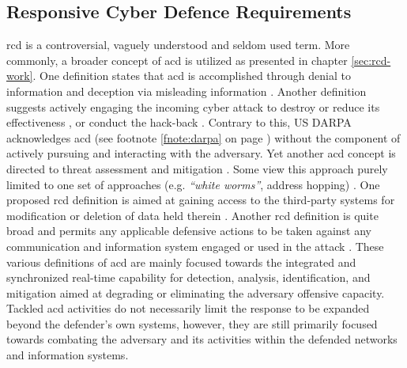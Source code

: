 \subsection{Responsive Cyber Defence Requirements}
\label{sec:rcd}
\glsresetall
\gls{rcd} is a controversial, vaguely understood and seldom used term. More commonly, a broader concept of \gls{acd} is utilized as presented in chapter \ref{sec:rcd-work}.
One definition states that \gls{acd} is accomplished through denial to information and deception via misleading information \cite{Heckman2013} \cite{Heckman2015}.
Another definition suggests actively engaging the incoming cyber attack to destroy or reduce its effectiveness \cite{Denning2014}, or conduct the hack-back \cite{Mansfield2009}.
Contrary to this, US DARPA acknowledges \gls{acd} (see footnote \ref{fnote:darpa} on page \pageref{fnote:darpa}) without the component of actively pursuing and interacting with the adversary.
Yet another \gls{acd} concept is directed to threat assessment and mitigation \cite{Dewar2017}.
Some view this approach purely limited to one set of approaches (e.g. \textit{``white worms''}, address hopping) \cite{Lu2013} \cite{Repik2008}.
One proposed \gls{rcd} definition is aimed at gaining access to the third-party systems for modification or deletion of data held therein \cite{Maybaum2014}.
Another \gls{rcd} definition is quite broad and permits any applicable defensive actions to be taken against any communication and information system engaged or used in the attack \cite{Brangetto2014-2}.
These various definitions of \gls{acd} are mainly focused towards the integrated and synchronized real-time capability for detection, analysis, identification, and mitigation aimed at degrading or eliminating the adversary offensive capacity.
Tackled \gls{acd} activities do not necessarily limit the response to be expanded beyond the defender's own systems, however, they are still primarily focused towards combating the adversary and its activities within the defended networks and information systems.

